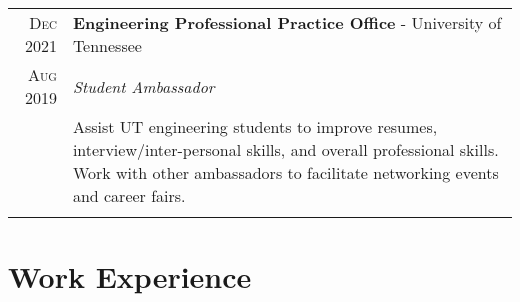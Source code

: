 \documentclass[a4paper,12pt]{article}
\begin{document}
\begin{tabularx}{\textwidth}{r|X}

   \textsc{Dec 2021} & \textbf{Engineering Professional Practice Office} \-- University of Tennessee\\
   \textsc{Aug 2019} & \emph{Student Ambassador}\\
   & \small{Assist UT engineering students to improve resumes, interview/inter-personal skills, and overall professional skills.
            Work with other ambassadors to facilitate networking events and career fairs.
   }\\

   \multicolumn{2}{c}{} \\

\end{tabularx}

\section{Work Experience}
\end{document}
